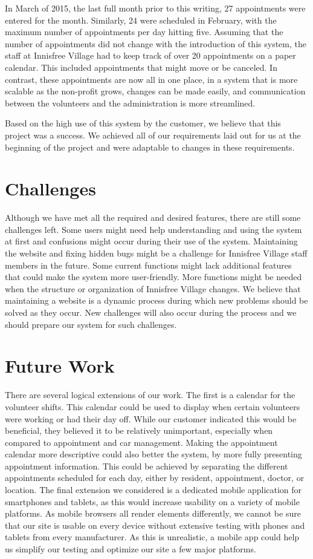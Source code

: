 \documentclass{sig-alternate}
\begin{document}
In March of 2015, the last full month prior to this writing, 27 appointments were entered for the month.  Similarly, 24 were scheduled in February, with the maximum number of appointments per day hitting five.  Assuming that the number of appointments did not change with the introduction of this system, the staff at Innisfree Village had to keep track of over 20 appointments on a paper calendar.  This included appointments that might move or be canceled.  In contrast, these appointments are now all in one place, in a system that is more scalable as the non-profit grows, changes can be made easily, and communication between the volunteers and the administration is more streamlined.

Based on the high use of this system by the customer, we believe that this project was a success.  We achieved all of our requirements laid out for us at the beginning of the project and were adaptable to changes in these requirements.

\section{Challenges}
Although we have met all the required and desired features, there are still some challenges left. Some users might need help understanding and using the system at first and confusions might occur during their use of the system. Maintaining the website and fixing hidden bugs might be a challenge for Innisfree Village staff members in the future. Some current functions might lack additional features that could make the system more user-friendly. More functions might be needed when the structure or organization of Innisfree Village changes. We believe that maintaining a website is a dynamic process during which new problems should be solved as they occur. New challenges will also occur during the process and we should prepare our system for such challenges.

\section{Future Work}
There are several logical extensions of our work. The first is a calendar for the volunteer shifts. This calendar could be used to display when certain volunteers were working or had their day off. While our customer indicated this would be beneficial, they believed it to be relatively unimportant, especially when compared to appointment and car management. Making the appointment calendar more descriptive could also better the system, by more fully presenting appointment information. This could be achieved by separating the different appointments scheduled for each day, either by resident, appointment, doctor, or location. The final extension we considered is a dedicated mobile application for smartphones and tablets, as this would increase usability on a variety of mobile platforms. As mobile browsers all render elements differently, we cannot be sure that our site is usable on every device without extensive testing with phones and tablets from every manufacturer. As this is unrealistic, a mobile app could help us simplify our testing and optimize our site a few major platforms.
\end{document}
